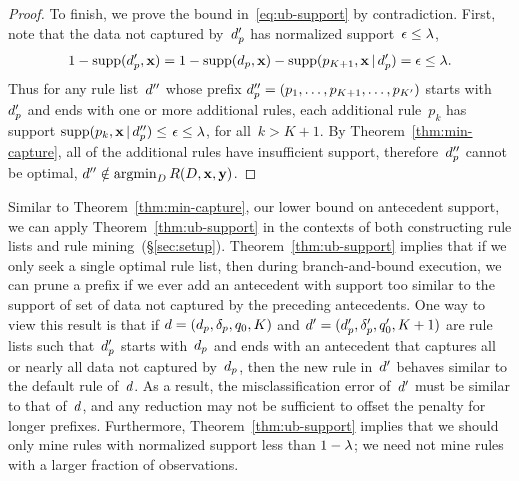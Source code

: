 \begin{arxiv}
\begin{proof}
To finish, we prove the bound in~\eqref{eq:ub-support} by contradiction.
%
First, note that the data not captured by~$d_p'$
has normalized support~${\epsilon \le {\lambda}}$, \ie
\begin{align}
1 - \textnormal{supp}(d_p', \mathbf{x}) = 1 - \textnormal{supp}(d_p, \mathbf{x}) - \textnormal{supp}(p_{K+1}, \mathbf{x} \,|\, d_p') = \epsilon \le {\lambda}.
\end{align}
Thus for any rule list~${d}''$ whose prefix
$d_p'' = (p_1, \dots, p_{K+1}, \dots, p_{K'})$ starts
with~$d_p'$ and ends with one or more additional rules,
each additional rule~$p_k$ has support
${\textnormal{supp}(p_k, \mathbf{x} \,|\, d_p'') \le}$ ${\epsilon \le {\lambda}}$,
for all~${k > K+1}$.
%
By Theorem~\ref{thm:min-capture},
all of the additional rules have insufficient support,
therefore~$d_p''$ cannot be optimal,
\ie ${{d}'' \notin \operatorname*{argmin}_{{D}} R({D}, \mathbf{x}, \mathbf{y})}$.
\end{proof}

Similar to Theorem~\ref{thm:min-capture}, our lower bound on
antecedent support, we can apply Theorem~\ref{thm:ub-support}
in the contexts of both constructing rule lists and
rule mining~(\S\ref{sec:setup}).
%
Theorem~\ref{thm:ub-support} implies that if we only seek a single
optimal rule list, then during branch-and-bound execution,
we can prune a prefix if we ever add an antecedent with support
too similar to the support of set of data not captured by the
preceding antecedents.
%
One way to view this result is that if
${{d} = (d_p, \delta_p, q_0, K)}$
and ${{d}' = (d_p', \delta_p', q_0', K + 1)}$
are rule lists such that~$d_p'$ starts with~$d_p$
and ends with an antecedent that captures all or nearly all
data not captured by~$d_p$, then the new rule in~${d}'$
behaves similar to the default rule of~${d}$.
%
As a result, the misclassification error of~${d}'$ must be
similar to that of~${d}$, and any reduction may not be
sufficient to offset the penalty for longer prefixes.
%
Furthermore, Theorem~\ref{thm:ub-support} implies that we should
only mine rules with normalized support less than ${1 - {\lambda}}$;
we need not mine rules with a larger fraction of observations.
\end{arxiv}

